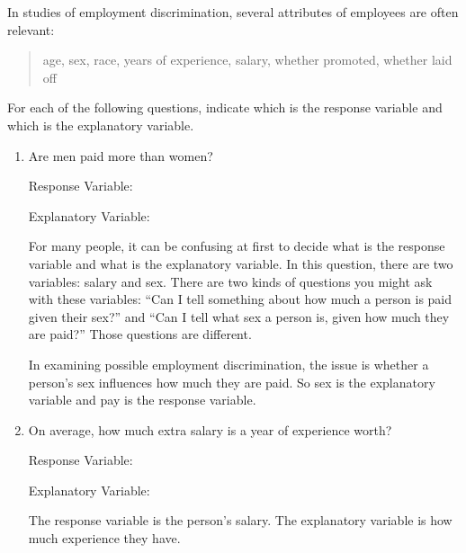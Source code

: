 
In studies of employment discrimination, several attributes of
employees are often relevant:
\begin{quotation}
\noindent
age,  sex, race, years of experience, salary, whether promoted, 
whether laid off 
\end{quotation}

For each of the following questions, indicate
which is the response variable and which is the explanatory variable.

\begin{enumerate}
\item Are men paid more than women? 

Response Variable:\\

Explanatory Variable:\\

\begin{AnswerText}
For many people, it can be confusing at first to decide what is the
response variable and what is the explanatory variable.  In this
question, there are two variables: salary and sex.  There are two
kinds of questions you might ask with these variables: ``Can I tell
something about how much a person is paid given their sex?'' and ``Can
I tell what sex a person is, given how much they are paid?''  Those
questions are different.  

In examining possible employment discrimination, the issue is whether
a person's sex influences how much they are paid.  So sex is the
explanatory variable and pay is the response variable.
\end{AnswerText}

\item On average, how much extra salary is a year of experience worth? 

Response Variable:\\

Explanatory Variable:\\ 

\begin{AnswerText}
The response variable is the person's salary.  The explanatory
variable is how much experience they have.
\end{AnswerText}


\end{enumerate}
